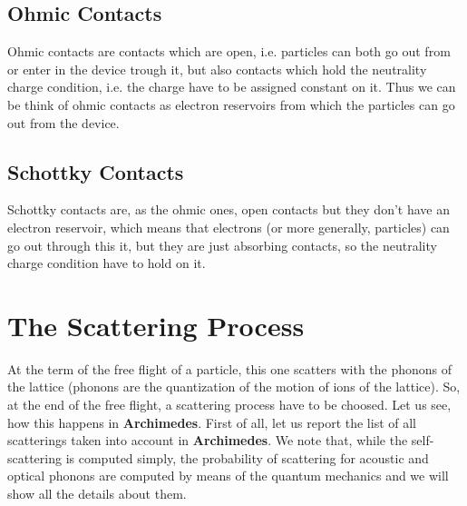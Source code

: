 \documentclass[12pt]{book}
\begin{document}
\subsection{Ohmic Contacts}

Ohmic contacts are contacts which are open, i.e. particles can both go out from or enter in the device trough it, but also contacts which hold the neutrality charge condition, i.e. the charge have to be assigned constant on it. Thus we can be think of ohmic contacts as electron reservoirs from which the particles can go out from the device. 

\subsection{Schottky Contacts}

Schottky contacts are, as the ohmic ones, open contacts but they don't have an electron reservoir, which means that electrons (or more generally, particles) can go out through this it, but they are just absorbing contacts, so the neutrality charge condition have to hold on it.

\section{The Scattering Process}

At the term of the free flight of a particle, this one scatters with the phonons of the lattice (phonons are the quantization of the motion of ions of the lattice). So, at the end of the free flight, a scattering process have to be choosed. Let us see, how this happens in \textbf{Archimedes}.
First of all, let us report the list of all scatterings taken into account in \textbf{Archimedes}. We note that, while the self-scattering is computed simply, the probability of scattering for acoustic and optical phonons are computed by means of the quantum mechanics and we will show all the details about them.
\end{document}
